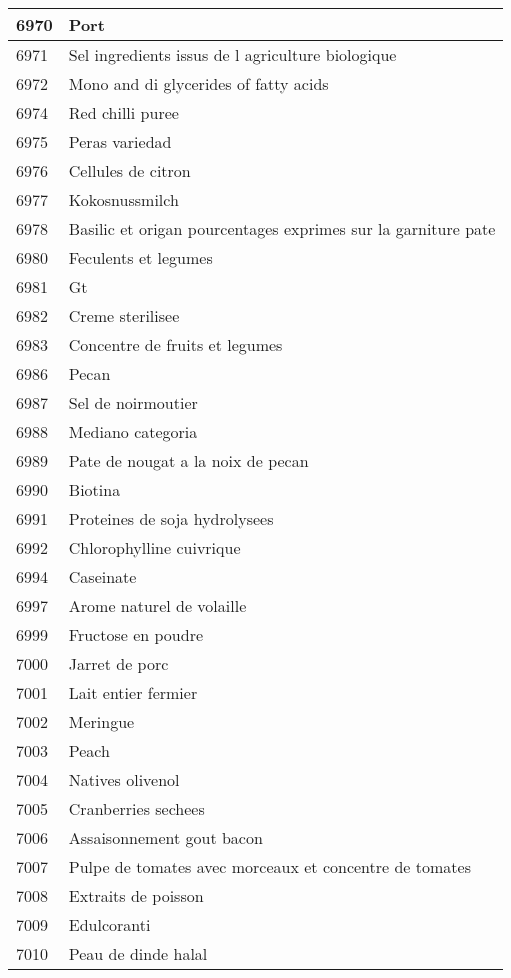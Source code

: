 \begin{longtable}{|l|l|}
6970 & Port \\ \hline 
6971 & Sel  ingredients issus de l agriculture biologique \\ \hline 
6972 & Mono and di glycerides of fatty acids \\ \hline 
6974 & Red chilli puree \\ \hline 
6975 & Peras variedad \\ \hline 
6976 & Cellules de citron \\ \hline 
6977 & Kokosnussmilch \\ \hline 
6978 & Basilic et origan pourcentages exprimes sur la garniture pate \\ \hline 
6980 & Feculents et legumes \\ \hline 
6981 & Gt \\ \hline 
6982 & Creme sterilisee \\ \hline 
6983 & Concentre de fruits et legumes \\ \hline 
6986 & Pecan \\ \hline 
6987 & Sel de noirmoutier \\ \hline 
6988 & Mediano categoria \\ \hline 
6989 & Pate de nougat a la noix de pecan \\ \hline 
6990 & Biotina \\ \hline 
6991 & Proteines de soja hydrolysees \\ \hline 
6992 & Chlorophylline cuivrique \\ \hline 
6994 & Caseinate \\ \hline 
6997 & Arome naturel de volaille \\ \hline 
6999 & Fructose en poudre \\ \hline 
7000 & Jarret de porc \\ \hline 
7001 & Lait entier fermier \\ \hline 
7002 & Meringue \\ \hline 
7003 & Peach \\ \hline 
7004 & Natives olivenol \\ \hline 
7005 & Cranberries sechees \\ \hline 
7006 & Assaisonnement gout bacon \\ \hline 
7007 & Pulpe de tomates avec morceaux et concentre de tomates \\ \hline 
7008 & Extraits de poisson \\ \hline 
7009 & Edulcoranti \\ \hline 
7010 & Peau de dinde halal \\ \hline 

\end{longtable}
